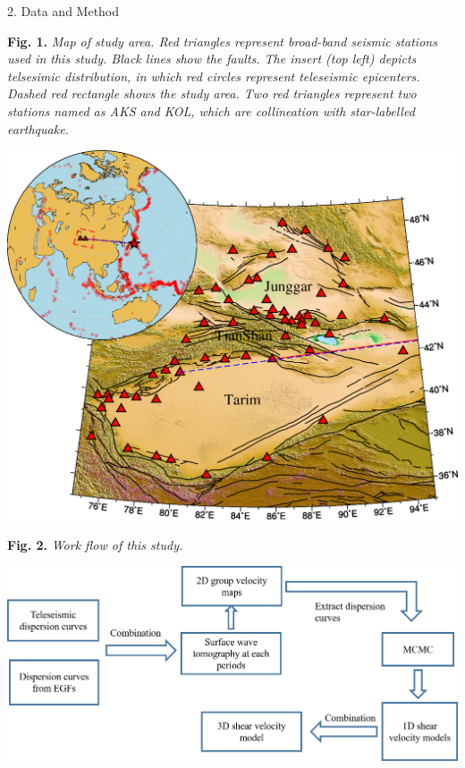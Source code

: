 \documentclass[
    landscape,      %
    paperwidth = 1200mm,
    paperheight = 900mm,
    fontscale = 0.4,
    margin = 1.7cm,
]{baposter}
\begin{document}
\begin{poster}
\begin{posterbox}[column=0, below=auto]{2. Data and Method}
\begin{center}
\begin{minipage}{0.3\textwidth}
\footnotesize
\textbf{Fig. 1.}
\itshape
Map of study area. Red triangles represent broad-band seismic stations
used in this study. Black lines show the faults.
The insert (top left) depicts telsesimic distribution, in which red circles represent
teleseismic epicenters.
Dashed red rectangle shows the study area. Two red triangles represent two stations
named as AKS and KOL, which are collineation with star-labelled earthquake.
\end{minipage}
\begin{minipage}{0.45\textwidth}
\includegraphics[width=\textwidth]{./images/XJ.png}
\end{minipage}
\hspace{0.1cm}
\end{center}


\begin{center}

\begin{minipage}{0.3\textwidth}
\footnotesize
\textbf{Fig. 2.}
\itshape
Work flow of this study.
\end{minipage}
\begin{minipage}{0.48\textwidth}
\includegraphics[width=\textwidth]{./images/Workflow.png}
\end{minipage}
\hspace{0.1cm}
\end{center}


\end{posterbox}
\end{poster}
\end{document}
